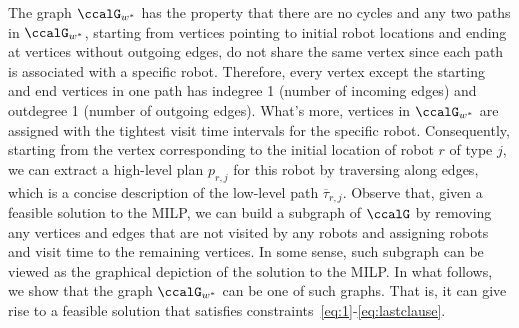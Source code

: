 \documentclass[Afour,sageh,times]{sagej}
\newcounter{phase} \setcounter{phase}{0}
\newcounter{subphase}[phase] \setcounter{subphase}{0}
\begin{document}
{{\label{app:strongly}


The graph $\ccalG_{w^*}$ has the property that there are no cycles and any two paths in $\ccalG_{w^*}$, starting from vertices pointing to initial robot locations  and ending at vertices without outgoing edges, do not share the same vertex since each path is associated with a specific robot. Therefore, every vertex except the starting and end vertices in one path has indegree 1 (number of incoming edges) and outdegree 1 (number of outgoing edges). What's more, vertices in $\ccalG_{w^*}$ are assigned with the tightest visit time intervals for the specific robot. Consequently, starting from the vertex corresponding to the initial location of robot $r$ of type $j$, we can extract a high-level plan $p_{r,j}$ for this robot by traversing along edges, which is a concise description of the low-level path $\overline{\tau}_{r,j}$. Observe that, given a feasible solution to the MILP, we can build a subgraph of $\ccalG$ by removing any vertices and edges that are not visited by any robots and assigning robots and visit time to the remaining vertices. In some sense, such subgraph can be viewed as the graphical depiction of the solution to the MILP. In what follows, we show that the graph $\ccalG_{w^*}$ can be one of such graphs. That is, it can give rise to a feasible solution that satisfies constraints~\eqref{eq:1}-\eqref{eq:lastclause}.

}}
\end{document}

